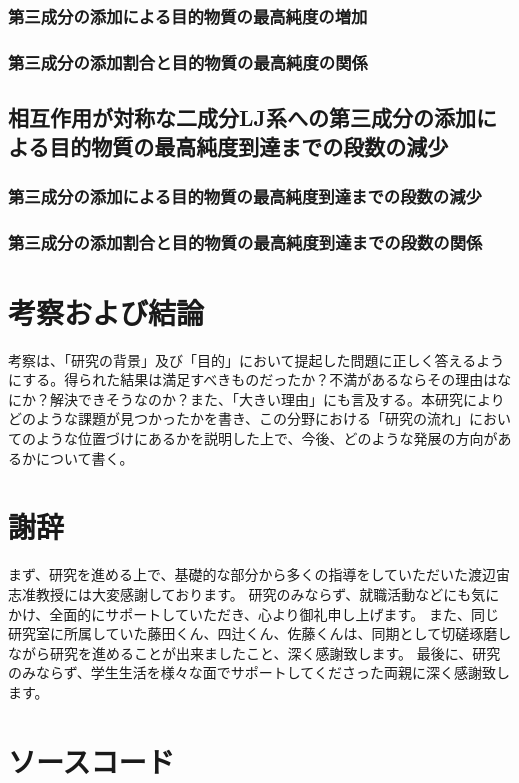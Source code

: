 \documentclass[titlepage]{jsreport}
\begin{document}
\subsection{第三成分の添加による目的物質の最高純度の増加} \label{results-subsec:bi-component-addition-of-3rd-component-highest-purity}
\subsection{第三成分の添加割合と目的物質の最高純度の関係} \label{results-subsec:bi-component-addition-of-3rd-component-addition-ratio-highest-purity}


\section{相互作用が対称な二成分LJ系への第三成分の添加による目的物質の最高純度到達までの段数の減少} \label{results-sec:bi-component-addition-of-3rd-component-steps}
\subsection{第三成分の添加による目的物質の最高純度到達までの段数の減少} \label{results-subsec:bi-component-addition-of-3rd-component-steps}
\subsection{第三成分の添加割合と目的物質の最高純度到達までの段数の関係} \label{results-subsec:bi-component-addition-of-3rd-component-addition-ratio-steps}


\chapter{考察および結論} \label{chap:summary}

考察は、「研究の背景」及び「目的」において提起した問題に正しく答えるようにする。得られた結果は満足すべきものだったか？不満があるならその理由はなにか？解決できそうなのか？また、「大きい理由」にも言及する。本研究によりどのような課題が見つかったかを書き、この分野における「研究の流れ」においてのような位置づけにあるかを説明した上で、今後、どのような発展の方向があるかについて書く。

\chapter*{謝辞}
まず、研究を進める上で、基礎的な部分から多くの指導をしていただいた渡辺宙志准教授には大変感謝しております。
研究のみならず、就職活動などにも気にかけ、全面的にサポートしていただき、心より御礼申し上げます。
また、同じ研究室に所属していた藤田くん、四辻くん、佐藤くんは、同期として切磋琢磨しながら研究を進めることが出来ましたこと、深く感謝致します。
最後に、研究のみならず、学生生活を様々な面でサポートしてくださった両親に深く感謝致します。

\appendix

\chapter{ソースコード}





\end{document}
